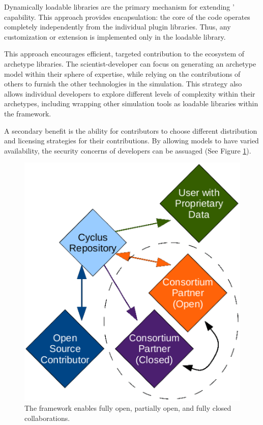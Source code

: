 Dynamically loadable libraries are the primary mechanism for extending \Cyclus' capability. 
This approach provides encapsulation: the core of the code operates
completely independently from the individual plugin libraries. Thus, any
customization or extension is implemented only in the loadable
library. 

This approach encourages efficient, targeted contribution to the ecosystem of 
archetype libraries.  The 
scientist-developer can focus on generating an archetype model within their
sphere of expertise, while relying on the contributions of others to furnish
the other technologies in the simulation.  This strategy also allows individual developers to
explore different levels of complexity within their archetypes, including
wrapping other simulation tools as loadable libraries within the \Cyclus
framework.

A secondary benefit is the ability for
contributors to choose different distribution and licensing strategies
for their contributions. By allowing models to have varied
availability, the security concerns of developers can be
assuaged (See Figure \ref{fig:modifiedopen}).

\begin{figure}[htbp!]
\begin{center}
\includegraphics{./images/modifiedopen.eps}
\end{center}
\caption{The \Cyclus framework enables fully open, partially open, and fully
closed collaborations\cite{carlsen_cyclus_2014}.}
\label{fig:modifiedopen}
\end{figure}

